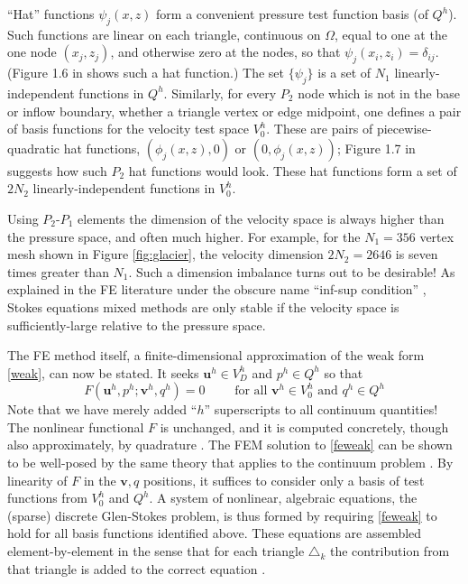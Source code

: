 \documentclass[letterpaper,final,12pt,reqno]{amsart}
\newcommand{\bu}{\mathbf{u}}
\newcommand{\bv}{\mathbf{v}}
\begin{document}
``Hat'' functions $\psi_j(x,z)$ form a convenient pressure test function basis (of $Q^h$).  Such functions are linear on each triangle, continuous on $\Omega$, equal to one at the one node $(x_j,z_j)$, and otherwise zero at the nodes, so that $\psi_j(x_i,z_i) = \delta_{ij}$.  (Figure 1.6 in \cite{Elmanetal2014} shows such a hat function.)  The set $\{\psi_j\}$ is a set of $N_1$ linearly-independent functions in $Q^h$.  Similarly, for every $P_2$ node which is not in the base or inflow boundary, whether a triangle vertex or edge midpoint, one defines a pair of basis functions for the velocity test space $V_0^h$.  These are pairs of piecewise-quadratic hat functions, $(\phi_j(x,z),0)$ or $(0,\phi_j(x,z))$; Figure 1.7 in \cite{Elmanetal2014} suggests how such $P_2$ hat functions would look.  These hat functions form a set of $2N_2$ linearly-independent functions in $V_0^h$.

Using $P_2$-$P_1$ elements the dimension of the velocity space is always higher than the pressure space, and often much higher.  For example, for the $N_1=356$ vertex mesh shown in Figure \ref{fig:glacier}, the velocity dimension $2N_2=2646$ is seven times greater than $N_1$.  Such a dimension imbalance turns out to be desirable!  As explained in the FE literature under the obscure name ``inf-sup condition'' \cite{Braess2007,Bueler2021,Elmanetal2014}, Stokes equations mixed methods are only stable if the velocity space is sufficiently-large relative to the pressure space.

The FE method itself, a finite-dimensional approximation of the weak form \eqref{weak}, can now be stated.  It seeks $\bu^h \in V_D^h$ and $p^h \in Q^h$ so that
\begin{equation}
F(\bu^h,p^h;\bv^h,q^h) = 0 \qquad \text{ for all } \bv^h\in V_0^h \text{ and } q^h\in Q^h  \label{feweak}
\end{equation}
Note that we have merely added ``$h$'' superscripts to all continuum quantities!  The nonlinear functional $F$ is unchanged, and it is computed concretely, though also approximately, by quadrature \cite{Bueler2021,Elmanetal2014}.  The FEM solution to \eqref{feweak} can be shown to be well-posed by the same theory that applies to the continuum problem \cite[Theorem 4.3]{JouvetRappaz2011}.  By linearity of $F$ in the $\bv,q$ positions, it suffices to consider only a basis of test functions from $V_0^h$ and $Q^h$.  A system of nonlinear, algebraic equations, the (sparse) discrete Glen-Stokes problem, is thus formed by requiring \eqref{feweak} to hold for all basis functions identified above.  These equations are assembled element-by-element in the sense that for each triangle $\triangle_k$ the contribution from that triangle is added to the correct equation \cite[Chapter 10]{Bueler2021}.
\end{document}
